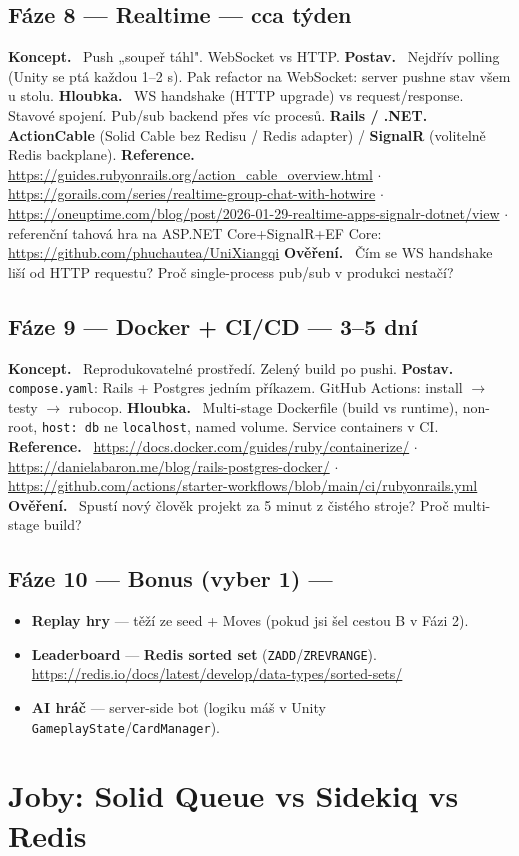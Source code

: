 \documentclass[11pt]{article}
\newcommand{\phase}[2]{\subsection{#1 \textnormal{\textcolor{soft}{\small— #2}}}}
\newcommand{\field}[1]{\textbf{#1.}\ }
\begin{document}
\phase{Fáze 8 — Realtime}{cca týden}
\field{Koncept} Push „soupeř táhl". WebSocket vs HTTP.
\field{Postav} Nejdřív polling (Unity se ptá každou 1–2 s). Pak refactor na WebSocket: server pushne stav všem u stolu.
\field{Hloubka} WS handshake (HTTP upgrade) vs request/response. Stavové spojení. Pub/sub backend přes víc procesů.
\field{Rails / .NET} \textbf{ActionCable} (Solid Cable bez Redisu / Redis adapter) / \textbf{SignalR} (volitelně Redis backplane).
\field{Reference} \url{https://guides.rubyonrails.org/action_cable_overview.html} $\cdot$ \url{https://gorails.com/series/realtime-group-chat-with-hotwire} $\cdot$ \url{https://oneuptime.com/blog/post/2026-01-29-realtime-apps-signalr-dotnet/view} $\cdot$ referenční tahová hra na ASP.NET Core+SignalR+EF Core: \url{https://github.com/phuchautea/UniXiangqi}
\field{Ověření} Čím se WS handshake liší od HTTP requestu? Proč single-process pub/sub v produkci nestačí?

\phase{Fáze 9 — Docker + CI/CD}{3–5 dní}
\field{Koncept} Reprodukovatelné prostředí. Zelený build po pushi.
\field{Postav} \texttt{compose.yaml}: Rails + Postgres jedním příkazem. GitHub Actions: install $\rightarrow$ testy $\rightarrow$ rubocop.
\field{Hloubka} Multi-stage Dockerfile (build vs runtime), non-root, \texttt{host: db} ne \texttt{localhost}, named volume. Service containers v CI.
\field{Reference} \url{https://docs.docker.com/guides/ruby/containerize/} $\cdot$ \url{https://danielabaron.me/blog/rails-postgres-docker/} $\cdot$ \url{https://github.com/actions/starter-workflows/blob/main/ci/rubyonrails.yml}
\field{Ověření} Spustí nový člověk projekt za 5 minut z čistého stroje? Proč multi-stage build?

\phase{Fáze 10 — Bonus (vyber 1)}{}
\begin{itemize}
  \item \textbf{Replay hry} — těží ze seed + Moves (pokud jsi šel cestou B v Fázi 2).
  \item \textbf{Leaderboard} — \textbf{Redis sorted set} (\texttt{ZADD}/\texttt{ZREVRANGE}). \url{https://redis.io/docs/latest/develop/data-types/sorted-sets/}
  \item \textbf{AI hráč} — server-side bot (logiku máš v Unity \texttt{GameplayState}/\texttt{CardManager}).
\end{itemize}

\section{Joby: Solid Queue vs Sidekiq vs Redis}
\end{document}
